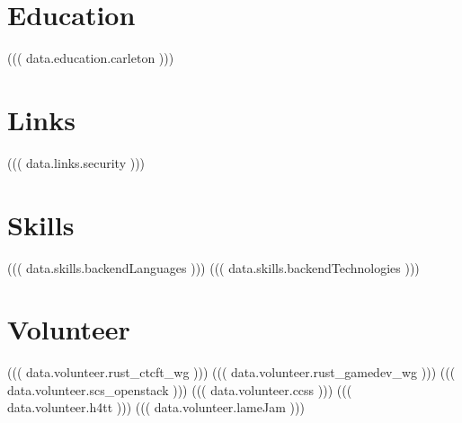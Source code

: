 \documentclass[]{deedy-resume-openfont}
\begin{document}
\vspace*{10pt}


%
%

\begin{minipage}[t]{0.33\textwidth}

\section{Education}

((( data.education.carleton )))

\section{Links}

((( data.links.security )))

\section{Skills}

((( data.skills.backendLanguages )))
((( data.skills.backendTechnologies )))

\section{Volunteer}

((( data.volunteer.rust_ctcft_wg )))
((( data.volunteer.rust_gamedev_wg )))
((( data.volunteer.scs_openstack )))
((( data.volunteer.ccss )))
((( data.volunteer.h4tt )))
((( data.volunteer.lameJam )))

%
%

\end{minipage} 
\hfill
\end{document}
